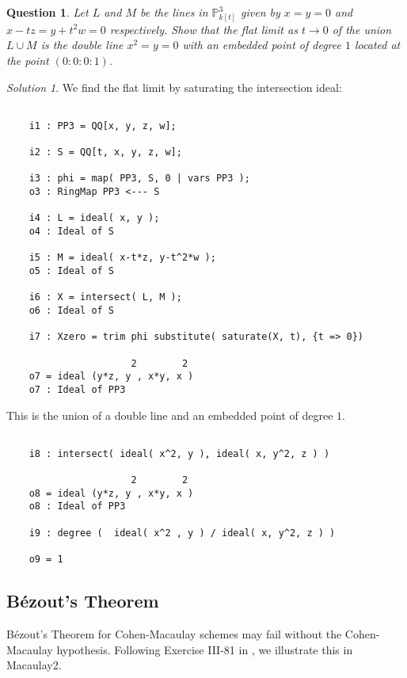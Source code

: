 \documentclass[12pt,noamsfonts]{amsart}
\def\PP{{\mathbb P}}
\newtheorem{question}{Question}
\theoremstyle{definition}
\theoremstyle{remark}
\newtheorem*{solution}{Solution}
\begin{document}
\begin{question}
Let $L$ and $M $  be the lines in $\PP^{3}_{k[t]}$ given by $x=y=0$
and $x-tz = y+t^{2}w =0$ respectively.  Show that the flat limit as $t
\to 0$ of the union $L \cup M$ is the double line $x^{2} = y = 0$ with
an embedded point of degree $1$ located at the point $(0:0:0:1)$.
\end{question}

\begin{solution}
We find the flat limit by saturating the intersection ideal:
{\scriptsize
\begin{verbatim}

    i1 : PP3 = QQ[x, y, z, w];
    
    i2 : S = QQ[t, x, y, z, w];
    
    i3 : phi = map( PP3, S, 0 | vars PP3 );
    o3 : RingMap PP3 <--- S
    
    i4 : L = ideal( x, y );
    o4 : Ideal of S
    
    i5 : M = ideal( x-t*z, y-t^2*w );
    o5 : Ideal of S
    
    i6 : X = intersect( L, M );
    o6 : Ideal of S
    
    i7 : Xzero = trim phi substitute( saturate(X, t), {t => 0})
    
                      2        2
    o7 = ideal (y*z, y , x*y, x )
    o7 : Ideal of PP3

\end{verbatim}}
\noindent This  is the union of a double line
and an embedded point of degree $1$.  
{\scriptsize
\begin{verbatim}    

    i8 : intersect( ideal( x^2, y ), ideal( x, y^2, z ) )

                      2        2
    o8 = ideal (y*z, y , x*y, x )
    o8 : Ideal of PP3

    i9 : degree (  ideal( x^2 , y ) / ideal( x, y^2, z ) )

    o9 = 1

\end{verbatim}}

\end{solution}

\subsection*{B\'{e}zout's Theorem}

B\'{e}zout's Theorem for Cohen-Macaulay schemes  \cite[Theorem III-78]{EH}
may fail without the Cohen-Macaulay
hypothesis.  Following Exercise III-81 in
\cite{EH}, we illustrate this in {\sc Macaulay2}.
\end{document}
